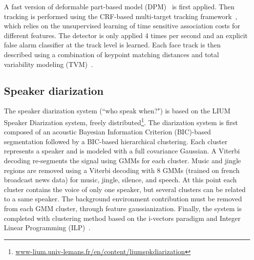 A fast version of deformable part-based model (DPM)~\cite{dubout2013deformable} is first applied. Then tracking is performed using the CRF-based multi-target tracking framework~\cite{heili2014tracking}, which relies on the unsupervised learning of time sensitive association costs for different features.
%
The detector is only applied 4 times per second and an explicit false alarm classifier at the track level is learned\cite{Le_ICPR_2016}.
%
Each face track is then described using a combination of keypoint matching distances and total variability modeling (TVM)~\cite{wallace2012total,Khoury:ICMR:2013}.

\subsection{Speaker diarization}

The speaker diarization system (``who speak when?") is based on the LIUM Speaker Diarization system\cite{rouvier2013}, freely distributed\footnote{\url{www-lium.univ-lemans.fr/en/content/liumspkdiarization}}. 
%
The diarization system is first composed of an acoustic Bayesian Information Criterion (BIC)-based segmentation followed by a BIC-based hierarchical clustering. Each cluster represents a speaker and is modeled with a full covariance Gaussian. A Viterbi decoding re-segments the signal using GMMs%
for each cluster. 
Music and jingle regions are removed using a Viterbi decoding with 8 GMMs (trained on french broadcast news data) for music, jingle, silence, and speech. %
%
At this point each cluster contains the voice of only one speaker, but several clusters can be related to a same speaker. The background environment contribution must be removed from each GMM cluster, through feature gaussianization.
%
Finally, the system is completed with clustering method based on the i-vectors paradigm and Integer Linear Programming (ILP)~\cite{rouvier12-2}. 

